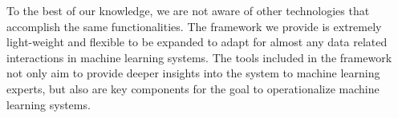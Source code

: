 To the best of our knowledge, we are not aware of other technologies that 
accomplish the same functionalities. The framework we provide is extremely 
light-weight and flexible to be expanded to adapt for almost any data related 
interactions in machine learning systems. The tools included in the framework 
not only aim to provide deeper insights into the system to machine learning 
experts, but also are key components for the goal to operationalize machine 
learning systems.
